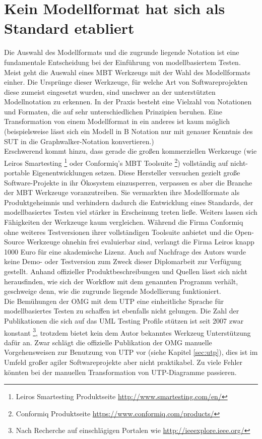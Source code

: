 \section{Kein Modellformat hat sich als Standard etabliert}
\label{sec:discussion_format}
Die Auswahl des Modellformats und die zugrunde liegende Notation ist eine fundamentale Entscheidung bei der Einführung von modellbasiertem Testen. Meist geht die Auswahl eines \Gls{MBT} Werkzeugs mit der Wahl des Modellformats einher. Die Ursprünge dieser Werkzeuge, für welche Art von Softwareprojekten diese zumeist eingesetzt wurden, sind unschwer an der unterstützten Modellnotation zu erkennen.  In der Praxis besteht eine Vielzahl von Notationen und Formaten, die auf sehr unterschiedlichen Prinzipien beruhen. Eine Transformation von einem Modellformat in ein anderes ist kaum möglich (beispielsweise lässt sich ein Modell in B Notation nur mit genauer Kenntnis des \Gls{SUT} in die Graphwalker-Notation konvertieren.)\\
Erschwerend kommt hinzu, dass gerade die großen kommerziellen Werkzeuge (wie Leiros Smartesting \footnote{Leiros Smartesting Produktseite \url{http://www.smartesting.com/en/}} oder Conformiq's \Gls{MBT} Toolsuite \footnote{Conformiq Produktseite \url{https://www.conformiq.com/products/}}) vollständig auf nicht-portable Eigenentwicklungen setzen. Diese Hersteller versuchen gezielt große Software-Projekte in ihr Ökosystem einzusperren, verpassen es aber die Branche der \Gls{MBT} Werkzeuge voranzutreiben. Sie vermarkten ihre Modellformate als Produktgeheimnis und verhindern dadurch die Entwicklung eines Standards, der modellbasiertes Testen viel stärker in Erscheinung treten ließe. Weiters lassen sich Fähigkeiten der Werkzeuge kaum vergleichen. Während die Firma Conformiq ohne weiteres Testversionen ihrer vollständigen Toolsuite anbietet und die Open-Source Werkzeuge ohnehin frei evaluierbar sind, verlangt die Firma Leiros knapp 1000 Euro für eine akademische Lizenz. Auch auf Nachfrage des Autors wurde keine Demo- oder Testversion zum Zweck dieser Diplomarbeit zur Verfügung gestellt. Anhand offizieller Produktbeschreibungen und Quellen lässt sich nicht herausfinden, wie sich der Workflow mit dem genannten Programm verhält, geschweige denn, wie die zugrunde liegende Modellierung funktioniert.\\
Die Bemühungen der \Gls{OMG} mit dem \Gls{UTP} eine einheitliche Sprache für modellbasiertes Testen zu schaffen ist ebenfalls nicht gelungen. Die Zahl der Publikationen die sich auf das UML Testing Profile stützen ist seit 2007 zwar konstant \footnote{Nach Recherche auf einschlägigen Portalen wie \url{http://ieeexplore.ieee.org/}}, trotzdem bietet kein dem Autor bekanntes Werkzeug Unterstützung dafür an. Zwar schlägt die offizielle Publikation der \Gls{OMG} \cite{_model-driven_2007} manuelle Vorgehensweisen zur Benutzung von \Gls{UTP} vor (siehe Kapitel \ref{sec:utp}), dies ist im Umfeld großer agiler Softwareprojekte aber nicht praktikabel. Zu viele Fehler könnten bei der manuellen Transformation von \Gls{UTP}-Diagramme passieren.\\
